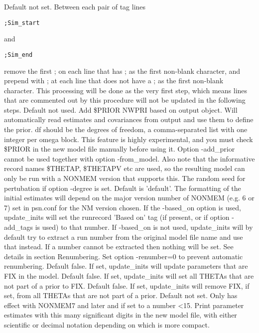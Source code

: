 \begin{optionlist}
\nextopt
{}
Default not set. Between each pair of tag lines
\begin{verbatim}
;Sim_start
\end{verbatim}
and
\begin{verbatim}
;Sim_end
\end{verbatim}
remove the first ; on each line that has ; as the first non-blank
character, and prepend with ; at each line that does not
have a ; as the first non-blank character.
This processing will be done as the very first step, which means lines
that are commented out by this procedure will not be updated in the following steps.
\nextopt
{}
Default not used. Add \$PRIOR NWPRI based on output object. Will automatically read
estimates and covariances from output and use them to define the 
prior. df should be the degrees of freedom, a comma-separated list
with one integer per omega block.
This feature is highly experimental, and you must check \$PRIOR 
in the new model file manually before using it.
Option -add\_prior cannot be used together with option -from\_model. 
Also note that the informative record names \$THETAP, \$THETAPV etc are used,
so the resulting model can only be run with a NONMEM version that 
supports this.
\nextopt
{}
The random seed for pertubation if option -degree is set.
\nextopt
{}
Default is 'default'. The formatting of the initial estimates will depend on the
major version number of NONMEM (e.g. 6 or 7) set in psn.conf for the
NM version chosen.
\nextopt
{}
If the -based\_on option is used, update\_inits will set 
the runrecord 'Based on' tag (if present, or if option -add\_tags is used) 
to that number. 
If -based\_on is not used, update\_inits will by default try to extract 
a run number from the original model file name and use that instead.
If a number cannot be extracted then nothing will be set. 
\nextopt
{}
See details in section Renumbering.
Set option -renumber=0 to prevent automatic renumbering.
\nextopt
{}
Default false. If set, update\_inits will update parameters that are FIX in the model.
\nextopt
{}
Default false. If set, update\_inits will set all THETAs that are not part of a prior to FIX.
\nextopt
{}
Default false. If set, update\_inits will remove FIX, if set, from all THETAs that are not part of a prior.
\nextopt
{}
Default not set.
Only has effect with NONMEM7 and later and if set to a number <15. 
Print parameter
estimates with this many significant digits in the new model file,
with either scientific or decimal notation depending on which is more compact.
\nextopt
\end{optionlist}


